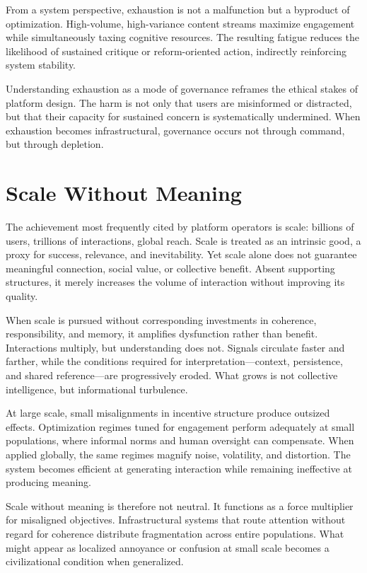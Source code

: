 \documentclass[12pt]{article}
\begin{document}
From a system perspective, exhaustion is not a malfunction but a byproduct of optimization. High-volume, high-variance content streams maximize engagement while simultaneously taxing cognitive resources. The resulting fatigue reduces the likelihood of sustained critique or reform-oriented action, indirectly reinforcing system stability.

Understanding exhaustion as a mode of governance reframes the ethical stakes of platform design. The harm is not only that users are misinformed or distracted, but that their capacity for sustained concern is systematically undermined. When exhaustion becomes infrastructural, governance occurs not through command, but through depletion.

\section{Scale Without Meaning}

The achievement most frequently cited by platform operators is scale: billions of users, trillions of interactions, global reach. Scale is treated as an intrinsic good, a proxy for success, relevance, and inevitability. Yet scale alone does not guarantee meaningful connection, social value, or collective benefit. Absent supporting structures, it merely increases the volume of interaction without improving its quality.

When scale is pursued without corresponding investments in coherence, responsibility, and memory, it amplifies dysfunction rather than benefit. Interactions multiply, but understanding does not. Signals circulate faster and farther, while the conditions required for interpretation—context, persistence, and shared reference—are progressively eroded. What grows is not collective intelligence, but informational turbulence.

At large scale, small misalignments in incentive structure produce outsized effects. Optimization regimes tuned for engagement perform adequately at small populations, where informal norms and human oversight can compensate. When applied globally, the same regimes magnify noise, volatility, and distortion. The system becomes efficient at generating interaction while remaining ineffective at producing meaning.

Scale without meaning is therefore not neutral. It functions as a force multiplier for misaligned objectives. Infrastructural systems that route attention without regard for coherence distribute fragmentation across entire populations. What might appear as localized annoyance or confusion at small scale becomes a civilizational condition when generalized.
\end{document}
